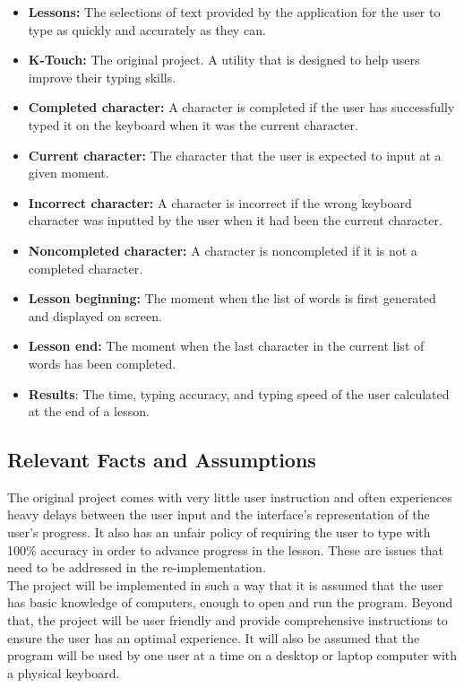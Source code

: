 \documentclass[12pt, titlepage]{article}
\begin{document}
\begin{itemize}
    \item \textbf{Lessons:} The selections of text provided by the application for the user to type as quickly and accurately as they can.
    \item \textbf{K-Touch:} The original project. A utility that is designed to help users improve their typing skills.
    \item\textbf{Completed character:} A character is completed if the user has successfully typed it on the keyboard when it was the current character. 
    \item \textbf{Current character:} The character that the user is expected to input at a given moment.
    \item\textbf{Incorrect character:} A character is incorrect if the wrong keyboard character was inputted by the user when it had been the current character.
    \item\textbf{Noncompleted character:} A character is noncompleted if it is not a completed character.
    \item \textbf{Lesson beginning:} The moment when the list of words is first generated and displayed on screen.
    \item \textbf{Lesson end:} The moment when the last character in the current list of words has been completed.
    \item \textbf{Results}: The time, typing accuracy, and typing speed of the user calculated at the end of a lesson.
\end{itemize}

\subsection{Relevant Facts and Assumptions}
\indent \indent The original project comes with very little user instruction and often experiences heavy delays between the user input and the interface's representation of the user's progress. It also has an unfair policy of requiring the user to type with 100\% accuracy in order to advance progress in the lesson. These are issues that need to be addressed in the re-implementation.
\\
\indent The project will be implemented in such a way that it is assumed that the user has basic knowledge of computers, enough to open and run the program. Beyond that, the project will be user friendly and provide comprehensive instructions to ensure the user has an optimal experience. It will also be assumed that the program will be used by one user at a time on a desktop or laptop computer with a physical keyboard.
\end{document}
